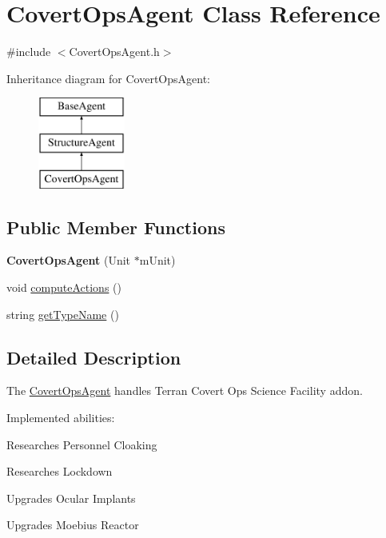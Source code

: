\hypertarget{class_covert_ops_agent}{
\section{CovertOpsAgent Class Reference}
\label{class_covert_ops_agent}
}


{\ttfamily \#include $<$CovertOpsAgent.h$>$}

Inheritance diagram for CovertOpsAgent:\begin{figure}[H]
\begin{center}
\leavevmode
\includegraphics[height=3.000000cm]{class_covert_ops_agent}
\end{center}
\end{figure}
\subsection*{Public Member Functions}
\begin{DoxyCompactItemize}
\item 
\hypertarget{class_covert_ops_agent_a8285bacd386a335f85b3617537c89d19}{
{\bfseries CovertOpsAgent} (Unit $\ast$mUnit)}
\label{class_covert_ops_agent_a8285bacd386a335f85b3617537c89d19}

\item 
void \hyperlink{class_covert_ops_agent_afac10c95b1758575ec7f71627e0eb0c4}{computeActions} ()
\item 
string \hyperlink{class_covert_ops_agent_a5f06cfffbf217084b607a0b71334a303}{getTypeName} ()
\end{DoxyCompactItemize}


\subsection{Detailed Description}
The \hyperlink{class_covert_ops_agent}{CovertOpsAgent} handles Terran Covert Ops Science Facility addon.

Implemented abilities:
\begin{DoxyItemize}
\item Researches Personnel Cloaking
\item Researches Lockdown
\item Upgrades Ocular Implants
\item Upgrades Moebius Reactor
\end{DoxyItemize}

